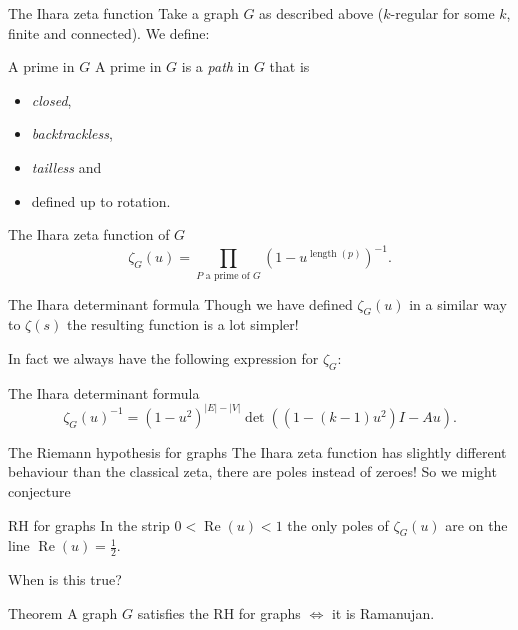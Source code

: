\documentclass{beamer}
\begin{document}
\begin{frame}{The Ihara zeta function}
Take a graph $G$ as described above ($k$-regular for some $k$, finite and connected).
We define:
\begin{block}{A prime in $G$}
A prime in $G$ is a \emph{path} in $G$ that is
\begin{itemize}
\pause\item \emph{closed},
\pause\item \emph{backtrackless},
\pause\item \emph{tailless} and
\pause\item defined up to rotation.
\end{itemize}
\end{block}
\pause \begin{block}{The Ihara zeta function of $G$}
\[\zeta_G(u) = \prod_{P\text{ a prime of } G} \left(1-u^{\operatorname{length}(p)}\right)^{-1}.\]
\end{block}
\end{frame}

\begin{frame}{The Ihara determinant formula}
Though we have defined $\zeta_G(u)$ in a similar way to $\zeta(s)$ the resulting function is a lot simpler!

\pause In fact we always have the following expression for $\zeta_G$:
\begin{block}{The Ihara determinant formula}
\[\zeta_G(u)^{-1} = (1-u^2)^{|E| - |V|}\det((1-(k-1)u^2)I - Au).\]
\end{block}
\end{frame}

\begin{frame}{The Riemann hypothesis for graphs}
The Ihara zeta function has slightly different behaviour than the classical zeta, there are poles instead of zeroes! 
\pause So we might conjecture
\begin{block}{RH for graphs}
In the strip $0<\operatorname{Re}(u) < 1$ the only poles of $\zeta_G(u)$ are on the line $\operatorname{Re}(u) = \frac{1}{2}$.
\end{block}
\pause When is this true? 
\pause\begin{block}{Theorem}
A graph $G$ satisfies the RH for graphs $\iff$ it is Ramanujan.
\end{block}
\end{frame}
\end{document}
